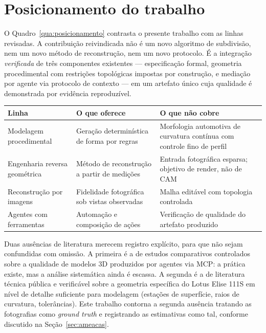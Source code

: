 \section{Posicionamento do trabalho}

O Quadro~\ref{qua:posicionamento} contrasta o presente trabalho com as linhas revisadas. A
contribui{\c{c}}\~ao reivindicada n\~ao \'e um novo algoritmo de subdivis\~ao, nem um novo m\'etodo
de reconstru{\c{c}}\~ao, nem um novo protocolo. \'E a integra{\c{c}}\~ao \emph{verificada} de
tr\^es componentes existentes --- especifica{\c{c}}\~ao formal, geometria procedimental com
restri{\c{c}}\~oes topol\'ogicas impostas por constru{\c{c}}\~ao, e media{\c{c}}\~ao por agente
via protocolo de contexto --- em um artefato \'unico cuja qualidade \'e demonstrada por
evid\^encia reproduz\'ivel.

\begin{quadro}[htbp]
\centering
\caption{Posicionamento em rela{\c{c}}\~ao \`as linhas de pesquisa revisadas}
\label{qua:posicionamento}
\footnotesize
\begin{tabular}{>{\raggedright\arraybackslash}p{3.5cm}>{\raggedright\arraybackslash}p{4.6cm}>{\raggedright\arraybackslash}p{5.7cm}}
\toprule
\textbf{Linha} & \textbf{O que oferece} & \textbf{O que n\~ao cobre} \\
\midrule
Modelagem procedimental & Gera{\c{c}}\~ao determin\'istica de forma por regras & Morfologia automotiva de curvatura cont\'inua com controle fino de perfil \\
Engenharia reversa geom\'etrica & M\'etodo de reconstru{\c{c}}\~ao a partir de medi{\c{c}}\~oes & Entrada fotogr\'afica esparsa; objetivo de render, n\~ao de CAM \\
Reconstru{\c{c}}\~ao por imagens & Fidelidade fotogr\'afica sob vistas observadas & Malha edit\'avel com topologia controlada \\
Agentes com ferramentas & Automa{\c{c}}\~ao e composi{\c{c}}\~ao de a{\c{c}}\~oes & Verifica{\c{c}}\~ao de qualidade do artefato produzido \\
\bottomrule
\end{tabular}
\end{quadro}

Duas aus\^encias de literatura merecem registro expl\'icito, para que n\~ao sejam confundidas com
omiss\~ao. A primeira \'e a de estudos comparativos controlados sobre a qualidade de modelos 3D
produzidos por agentes via MCP: a pr\'atica existe, mas a an\'alise sistem\'atica ainda \'e
escassa. A segunda \'e a de literatura t\'ecnica p\'ublica e verific\'avel sobre a geometria
espec\'ifica do Lotus Elise 111S em n\'ivel de detalhe suficiente para modelagem
(esta{\c{c}}\~oes de superf\'icie, raios de curvatura, toler\^ancias). Este trabalho contorna a
segunda aus\^encia tratando as fotografias como \emph{ground truth} e registrando as
estimativas como tal, conforme discutido na Se{\c{c}}\~ao~\ref{sec:ameacas}.
